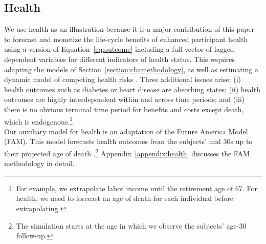 \subsection{Health}

\noindent We use health as an illustration because it is a major contribution of this paper to forecast and monetize the life-cycle benefits of enhanced participant health using a version of Equation~\eqref{eq:outcome} including a full vector of lagged dependent variables for different indicators of health status. This requires adapting the models of Section~\ref{section:cbamethodology}, as well as estimating a dynamic model of competing health risks \citep{Kalbfleisch_Prentice_1980_failure}. Three additional issues arise: (i) health outcomes such as diabetes or heart disease are absorbing states; (ii) health outcomes are highly interdependent within and across time periods; and (iii) there is no obvious terminal time period for benefits and costs except death, which is endogenous.\footnote{For example, we extrapolate labor income until the retirement age of 67. For health, we need to forecast an age of death for each individual before extrapolating.}\\

\noindent Our auxiliary model for health is an adaptation of the Future America Model (FAM). This model forecasts health outcomes from the subjects' mid 30s up to their projected age of death \citep{Goldman_etal_2015_Future-Elderly-Model-Report}.\footnote{The simulation starts at the age in which we observe the subjects' age-30 follow-up.}  Appendix~\ref{appendix:health} discusses the FAM methodology in detail.\\

